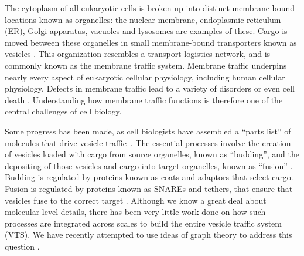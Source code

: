 \noindent 
The cytoplasm of all eukaryotic cells is broken up into distinct membrane-bound locations known as organelles: the
nuclear membrane, endoplasmic reticulum (ER), Golgi apparatus, vacuoles and lysosomes are examples of these.
%
%
%
%
%
%
Cargo is moved between these organelles in small membrane-bound
transporters known as vesicles \cite{stenmark2009rab}.
%
This organization resembles a transport logistics network, and is commonly known as the membrane traffic system.
%
Membrane traffic underpins nearly every aspect of eukaryotic cellular
physiology, including human cellular physiology.
%
Defects in membrane traffic lead to a variety of disorders or even
cell death \cite{stenmark2009rab}.
%
Understanding how membrane traffic functions is therefore one of the
central challenges of cell biology.
%

Some progress has been made, as cell biologists have assembled a
“parts list” of molecules that drive vesicle
traffic~\cite{dacks2007evolution}.
%
The essential processes involve the creation of vesicles loaded with
cargo from source organelles, known as “budding”, and the depositing
of those vesicles and cargo into target organelles, known as “fusion”
\cite{munro2004organelle}.
%
Budding is regulated by proteins known as coats and adaptors that
select cargo.
%
Fusion is regulated by proteins known as SNAREs and tethers, that
ensure that vesicles fuse to the correct target
\cite{mani2016stacking}.
%
Although we know a great deal about molecular-level details, there has
been very little work done on how such processes are integrated across
scales to build the entire vesicle traffic system (VTS).
%
We have recently attempted to use ideas of graph theory to address
this question \cite{mani2016stacking,shukla2017discovering}.

